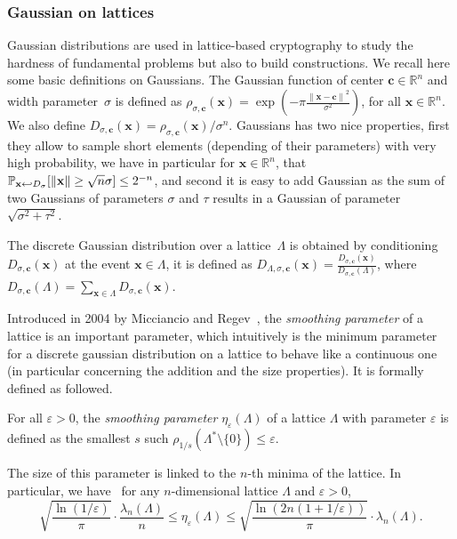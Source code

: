 \subsubsection{Gaussian on lattices}

 Gaussian distributions are used in lattice-based cryptography to study the hardness of fundamental problems but also to build constructions. We recall here some basic definitions on Gaussians.
The Gaussian function of center $\mathbf{c} \in \mathbb{R}^{n}$ and width parameter~$\sigma$ is defined as $\rho_{\sigma, \mathbf{c}} (\mathbf{x}) = \exp (- \pi \frac{\left\|\mathbf{x} - \mathbf{c}\right\|^2}{\sigma^2})$, for all $\mathbf{x} \in \mathbb{R}^{n}$. We also define $D_{\sigma,\mathbf{c}}(\mathbf{x}) = \rho_{\sigma,\mathbf{c}}(\mathbf{x}) / \sigma^n$. Gaussians has two nice properties, first they allow to sample short elements (depending of their parameters) with very high probability, we have in particular for $\mathbf{x} \in \mathbb{R}^n$, that $\mathbb{P}_{\mathbf{x} \hookleftarrow D_{\sigma}} [\Vert \mathbf{x} \Vert \geq \sqrt{n} \sigma] \leq 2^{-n}$, and second it is easy to add Gaussian as the sum of two Gaussians of parameters $\sigma$ and $\tau$ results in a Gaussian of parameter  ${\sqrt{\sigma^2 + \tau^2}}$. 

The discrete Gaussian distribution over a lattice~$\Lambda$ is obtained by conditioning $D_{\sigma,\mathbf{c}}(\mathbf{x})$ at the event $\mathbf{x} \in \Lambda$, it is defined as $D_{\Lambda, \sigma, \mathbf{c}}(\mathbf{x}) = \frac{D_{\sigma, \mathbf{c}}(\mathbf{x})}{D_{\sigma, \mathbf{c}}(\Lambda)}$, where $D_{\sigma, \mathbf{c}}(\Lambda) = \sum_{\mathbf{x} \in \Lambda} D_{\sigma, \mathbf{c}}(\mathbf{x})$.

Introduced in 2004 by Micciancio and Regev~\cite{MR04}, the \emph{smoothing parameter} of a lattice is an important parameter, which intuitively is the minimum parameter for a discrete gaussian distribution on a lattice to behave like a continuous one (in particular concerning the addition and the size properties). It is formally defined as followed.

\begin{definition}\label{def:smoothing}
For all $\varepsilon >0$, the \emph{smoothing parameter} $\eta_{\varepsilon}(\Lambda)$ of a lattice $\Lambda$ with parameter $\varepsilon$ is defined as the smallest $s$ such $\rho_{1/s}(\Lambda^* \setminus \{0\}) \leq \varepsilon$.
\end{definition}

The size of this parameter is linked to the $n$-th minima of the lattice. In particular, we have~\cite{MR04,Reg05} for any $n$-dimensional lattice $\Lambda$ and $\varepsilon >0$, 
$$\sqrt{\frac{\ln(1/\varepsilon)}{\pi}} \cdot \frac{ \lambda_n (\Lambda)}{n} \leq \eta_{\varepsilon}(\Lambda) \leq \sqrt{\frac{\ln(2n(1+1/\varepsilon))}{\pi}} \cdot \lambda_n (\Lambda). $$

